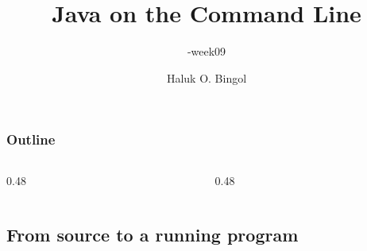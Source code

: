\documentclass[aspectratio=169,10pt,compress]{beamer}
\title[\cisOOO-week13-CLI]{
	Java on the Command Line
}
\subtitle{
	\cisOOO-week09
}
\author[Bingol]{
	Haluk O. Bingol
}
\institute[FCIS]{
    Faculty of Computer and Information Sciences\\
    Yeditepe University
}
\date{
	{\tiny \hbTimeStamp}
}
\begin{document}




\begin{frame}[t,fragile]
  \titlepage
\end{frame}




\begin{frame}[t,fragile] \frametitle{Outline}
  \begin{columns}[T]
    \begin{column}{0.48\textwidth}
      \tableofcontents[sections={1-7}, hideallsubsections]
    \end{column}
    \begin{column}{0.48\textwidth}
      \tableofcontents[sections={8-14}, hideallsubsections]
    \end{column}
  \end{columns}
\end{frame}








\subsection[Pipeline]{From source to a running program}
\end{document}
